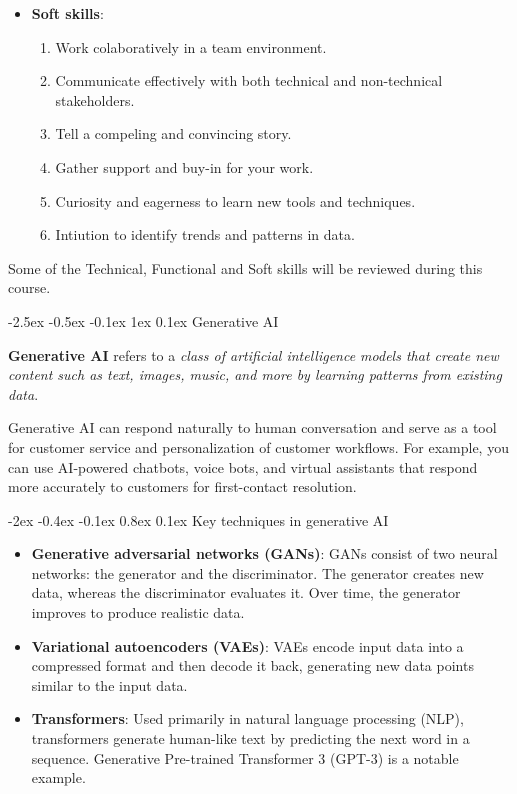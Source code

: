 \documentclass[12pt]{report}
\makeatletter
\renewcommand{\section}{\@startsection{section}{1}{\z@}%
  {-2.5ex \@plus -0.5ex \@minus -0.1ex}%
  {1ex \@plus 0.1ex}%
  {\normalfont\Large\sectionstyle}}
\newcommand{\sectionstyle}[1]{%
  \par\noindent\hrule
  \vspace{0.2ex}%
  {\scshape{#1}\par}%
  \vspace{0.4ex}%
  \hrule
}
\renewcommand{\subsection}{\@startsection{subsection}{2}{\z@}%
  {-2ex \@plus -0.4ex \@minus -0.1ex}%
  {0.8ex \@plus 0.1ex}%
  {\normalfont\large\subsectionstyle}}
\newcommand{\subsectionstyle}[1]{%
  \par\noindent\hrule
  \vspace{-0.4ex}%
  {\scshape #1\par}%
  \vspace{0.4ex}%
  \hrule
}
\theoremstyle{largebreak}
\makeatother
\begin{document}
\begin{itemize}
        \item \textbf{Soft skills}:
        \begin{enumerate}[label = \textit{(\arabic*)}]
            \item Work colaboratively in a team environment.
            \item Communicate effectively with both technical and non-technical stakeholders.
            \item Tell a compeling and convincing story.
            \item Gather support and buy-in for your work.
            \item Curiosity and eagerness to learn new tools and techniques.
            \item Intiution to identify trends and patterns in data.
        \end{enumerate}
    \end{itemize}

    Some of the Technical, Functional and Soft skills will be reviewed during this course.

    \section{Generative AI}

    \begin{mydef}
        \textbf{Generative AI} refers to a \textit{class of artificial intelligence models that create new content such as text, images, music, and more by learning patterns from existing data}. 
    \end{mydef}

    Generative AI can respond naturally to human conversation and serve as a tool for customer service and personalization of customer workflows. For example, you can use AI-powered chatbots, voice bots, and virtual assistants that respond more accurately to customers for first-contact resolution.

    \subsection{Key techniques in generative AI}

    \begin{itemize}
        \item \textbf{Generative adversarial networks (GANs)}: GANs consist of two neural networks: the generator and the discriminator. The generator creates new data, whereas the discriminator evaluates it. Over time, the generator improves to produce realistic data.
    
        \item \textbf{Variational autoencoders (VAEs)}: VAEs encode input data into a compressed format and then decode it back, generating new data points similar to the input data.
        
        \item \textbf{Transformers}: Used primarily in natural language processing (NLP), transformers generate human-like text by predicting the next word in a sequence. Generative Pre-trained Transformer 3 (GPT-3) is a notable example.
    \end{itemize}
\end{document}
